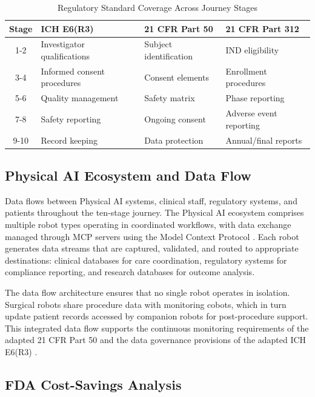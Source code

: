 \begin{table}[H]
\centering
\caption{Regulatory Standard Coverage Across Journey Stages}
\label{tab:journey-compliance}
\small
\begin{tabularx}{\textwidth}{c X X X}
\toprule
\textbf{Stage} & \textbf{ICH E6(R3)} & \textbf{21 CFR Part 50} & \textbf{21 CFR Part 312} \\
\midrule
1-2 & Investigator qualifications & Subject identification & IND eligibility \\
3-4 & Informed consent procedures & Consent elements & Enrollment procedures \\
5-6 & Quality management & Safety matrix & Phase reporting \\
7-8 & Safety reporting & Ongoing consent & Adverse event reporting \\
9-10 & Record keeping & Data protection & Annual/final reports \\
\bottomrule
\end{tabularx}
\end{table}

\subsection{Physical AI Ecosystem and Data Flow}
\label{subsec:journey-ecosystem}

Data flows between Physical AI systems, clinical staff, regulatory systems, and
patients throughout the ten-stage journey. The Physical AI ecosystem comprises
multiple robot types operating in coordinated workflows, with data exchange
managed through MCP servers \cite{national-mcp-paper} using the Model Context
Protocol \cite{mcp-protocol}. Each robot generates data streams that are
captured, validated, and routed to appropriate destinations: clinical databases
for care coordination, regulatory systems for compliance reporting, and
research databases for outcome analysis.

The data flow architecture ensures that no single robot operates in isolation.
Surgical robots share procedure data with monitoring cobots, which in turn
update patient records accessed by companion robots for post-procedure support.
This integrated data flow supports the continuous monitoring requirements of
the adapted 21 CFR Part 50 \cite{cfr50-adapt} and the data governance
provisions of the adapted ICH E6(R3) \cite{ich-adapt}.

\subsection{FDA Cost-Savings Analysis}
\label{subsec:journey-cost}

